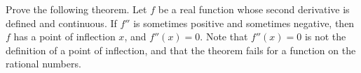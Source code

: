 Prove the following theorem. Let $f$ be a real function whose
second derivative is defined and continuous. If $f''$ is
sometimes positive and sometimes negative, then $f$ has
a point of inflection $x$, and $f''(x)=0$. Note that
$f''(x)=0$ is not the definition of a point of inflection,
and that the theorem fails for a function on the rational
numbers.
